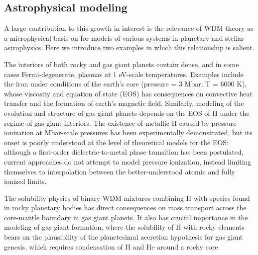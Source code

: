 \documentclass [11pt, proquest, article] {uwthesis}[2016/11/22]
\begin{document}
\subsection{Astrophysical modeling}
A large contribution to this growth in interest is the relevance of WDM theory as a microphysical basis on for models of various systems in planetary and stellar astrophysics. Here we introduce two examples in which this relationship is salient.

The interiors of both rocky and gas giant planets contain dense, and in some cases Fermi-degenerate, plasmas at 1 eV-scale temperatures. Examples include the iron under conditions of the earth's core (pressure = 3 Mbar; T = 6000 K), whose viscosity and equation of state (EOS) has consequences on convective heat transfer and the formation of earth's magnetic field. \cite{kuang1997earth} Similarly, modeling of the evolution and structure of gas giant planets depends on the EOS of H under the regime of gas giant interiors. The existence of metallic H caused by pressure ionization at Mbar-scale pressures has been experimentally demonstrated, but its onset is poorly understood at the level of theoretical models for the EOS: although a first-order dielectric-to-metal phase transition has been postulated, current approaches do not attempt to model pressure ionization, instead limiting themselves to interpolation between the better-understood atomic and fully ionized limits. \cite{EBELING198580} %

The solubility physics of binary WDM mixtures combining H with species found in rocky planetary bodies has direct consequences on mass transport across the core-mantle boundary in gas giant planets. It also has crucial importance in the modeling of gas giant formation, where the solubility of H with rocky elements bears on the plausibility of the planetesimal accretion hypothesis for gas giant genesis, which requires condensation of H and He around a rocky core. \cite{wilson2012rocky} 
\end{document}
